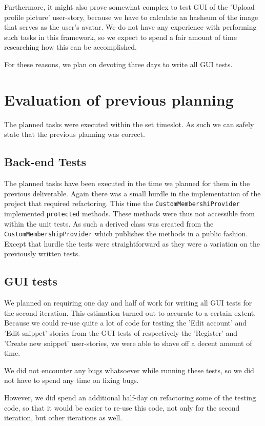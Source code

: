 \documentclass[10pt,a4paper,BCOR12mm, headexclude, footexclude,
  twoside, openright]{scrartcl}
\numberwithin{equation}{section} %
\numberwithin{figure}{section} %
\numberwithin{table}{section} %
\begin{document}
Furthermore, it might also prove somewhat complex to test GUI of the 'Upload profile picture' user-story, because we have to calculate an hashsum of the image that serves as the user's avatar.
We do not have any experience with performing such tasks in this framework, so we expect to spend a fair amount of time researching how this can be accomplished.

For these reasons, we plan on devoting three days to write all GUI tests.

\section{Evaluation of previous planning}
The planned tasks were executed within the set timeslot. As such we can safely
state that the previous planning was correct.
\subsection{Back-end Tests}
The planned tasks have been executed in the time we planned for them in the
previous deliverable. Again there was a small hurdle in the implementation of
the project that required refactoring. This time the
\texttt{CustomMembershiProvider} implemented \texttt{protected} methods. These
methods were thus not accessible from within the unit tests. As such a derived
class was created from the \texttt{CustomMembershipProvider} which publishes the
methods in a public fashion. Except that hurdle the tests were straightforward
as they were a variation on the previously written tests.

\subsection{GUI tests}
We planned on requiring one day and half of work for writing all GUI tests for the second iteration.
This estimation turned out to accurate to a certain extent. Because we could re-use quite a lot of code for testing the 'Edit account' and 'Edit snippet' stories from the GUI tests of respectively the 'Register' and 'Create new snippet' user-stories, we were able to shave off a decent amount of time.

We did not encounter any bugs whatsoever while running these tests, so we did not have to spend any time on fixing bugs.

However, we did spend an additional half-day on refactoring some of the testing code, so that it would be easier to re-use this code, not only for the second iteration, but other iterations as well.
\end{document}
